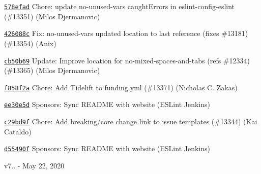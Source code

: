\begin{DoxyItemize}
\item \href{https://github.com/eslint/eslint/commit/578efad331b797e28c0f5f1547ce4769d2ea23ee}{\texttt{ {\ttfamily 578efad}}} Chore\+: update no-\/unused-\/vars caught\+Errors in eslint-\/config-\/eslint (\#13351) (Milos Djermanovic)
\item \href{https://github.com/eslint/eslint/commit/426088c966dc79dc338b33100f3adf827b147d69}{\texttt{ {\ttfamily 426088c}}} Fix\+: no-\/unused-\/vars updated location to last reference (fixes \#13181) (\#13354) (Anix)
\item \href{https://github.com/eslint/eslint/commit/cb50b69c08d4393e32d5c42c537d769c51dd34d8}{\texttt{ {\ttfamily cb50b69}}} Update\+: Improve location for no-\/mixed-\/spaces-\/and-\/tabs (refs \#12334) (\#13365) (Milos Djermanovic)
\item \href{https://github.com/eslint/eslint/commit/f858f2a8f83232484491bd90b0bc5001b5056ad0}{\texttt{ {\ttfamily f858f2a}}} Chore\+: Add Tidelift to funding.\+yml (\#13371) (Nicholas C. Zakas)
\item \href{https://github.com/eslint/eslint/commit/ee30e5d8bb1a4c82a2a3fbe1b9ee9f979b55c5c4}{\texttt{ {\ttfamily ee30e5d}}} Sponsors\+: Sync README with website (ESLint Jenkins)
\item \href{https://github.com/eslint/eslint/commit/c29bd9f75582e5b1a403a8ffd0aafd1ffc8c58e1}{\texttt{ {\ttfamily c29bd9f}}} Chore\+: Add breaking/core change link to issue templates (\#13344) (Kai Cataldo)
\item \href{https://github.com/eslint/eslint/commit/d55490fa73ff69416de375e4c1cd67b6edba531c}{\texttt{ {\ttfamily d55490f}}} Sponsors\+: Sync README with website (ESLint Jenkins)
\end{DoxyItemize}

v7.. -\/ May 22, 2020


